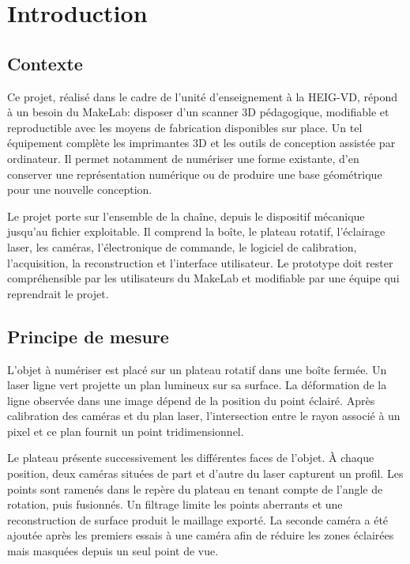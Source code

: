 \section{Introduction}

\subsection{Contexte}

Ce projet, réalisé dans le cadre de l'unité d'enseignement \filiere{} à la
HEIG-VD, répond à un besoin du MakeLab: disposer d'un scanner 3D pédagogique,
modifiable et reproductible avec les moyens de fabrication disponibles sur
place. Un tel équipement complète les imprimantes 3D et les outils de
conception assistée par ordinateur. Il permet notamment de numériser une forme
existante, d'en conserver une représentation numérique ou de produire une
base géométrique pour une nouvelle conception.

Le projet porte sur l'ensemble de la chaîne, depuis le dispositif mécanique
jusqu'au fichier exploitable. Il comprend la boîte, le plateau rotatif,
l'éclairage laser, les caméras, l'électronique de commande, le logiciel de
calibration, l'acquisition, la reconstruction et l'interface utilisateur. Le
prototype doit rester compréhensible par les utilisateurs du MakeLab et
modifiable par une équipe qui reprendrait le projet.

\subsection{Principe de mesure}

L'objet à numériser est placé sur un plateau rotatif dans une boîte fermée. Un
laser ligne vert projette un plan lumineux sur sa surface. La déformation de
la ligne observée dans une image dépend de la position du point éclairé. Après
calibration des caméras et du plan laser, l'intersection entre le rayon associé
à un pixel et ce plan fournit un point tridimensionnel.

Le plateau présente successivement les différentes faces de l'objet. À chaque
position, deux caméras situées de part et d'autre du laser capturent un profil.
Les points sont ramenés dans le repère du plateau en tenant compte de l'angle
de rotation, puis fusionnés. Un filtrage limite les points aberrants et une
reconstruction de surface produit le maillage exporté. La seconde caméra a été
ajoutée après les premiers essais à une caméra afin de réduire les zones
éclairées mais masquées depuis un seul point de vue.

